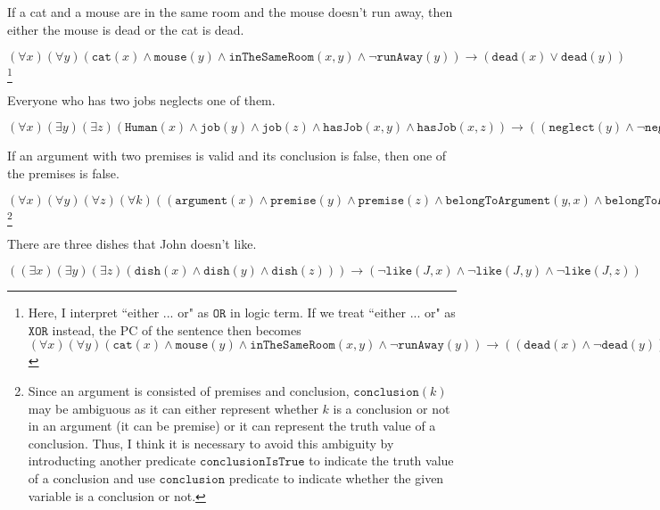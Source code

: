 \begin{QandA}
   \item If a cat and a mouse are in the same room and the mouse doesn’t run away, then either the mouse is dead or the cat is dead.
         \begin{answered}
         $(\forall x)(\forall y)(\texttt{cat}(x) \land \texttt{mouse}(y) \land \texttt{inTheSameRoom}(x,y) \land \neg \texttt{runAway}(y)) 
         \rightarrow (\texttt{dead}(x) \lor \texttt{dead}(y))$ \footnote{Here, I interpret ``either ... or" as $\texttt{OR}$ in logic term. If
         we treat ``either ... or" as $\texttt{XOR}$ instead, the PC of the sentence then becomes
         $(\forall x)(\forall y)(\texttt{cat}(x) \land \texttt{mouse}(y) \land \texttt{inTheSameRoom}(x,y) \land \neg \texttt{runAway}(y)) 
         \rightarrow ((\texttt{dead}(x) \land \neg \texttt{dead}(y)) \lor (\texttt{dead}(y) \land \neg \texttt{dead}(x)))$} 
         \end{answered}
   \item Everyone who has two jobs neglects one of them.
         \begin{answered}
         $(\forall x)(\exists y)(\exists z)(\texttt{Human}(x) \land \texttt{job}(y) \land \texttt{job}(z) \land \texttt{hasJob}(x,y) \land
         \texttt{hasJob}(x,z)) \rightarrow ((\texttt{neglect}(y) \land \neg \texttt{neglect}(z)) \lor (\texttt{neglect}(z) \land 
         \neg \texttt{neglect}(y)))$
         \end{answered}
   \item If an argument with two premises is valid and its conclusion is false, then one of the premises is false.
         \begin{answered}
         $(\forall x)(\forall y)(\forall z)(\forall k)((\texttt{argument}(x) \land \texttt{premise}(y) \land \texttt{premise}(z)
         \land \texttt{belongToArgument}(y,x) \land \texttt{belongToArgument}(z,x) \land \texttt{valid}(x) \land \texttt{conclusion}(k)
         \land \neg \text{conclusionIsTrue}(k) \land \texttt{belongToArgument}(k,x)) \rightarrow (\neg y \lor \neg z))$ 
         \footnote{Since an argument is consisted of premises and conclusion, $\texttt{conclusion}(k)$ may be ambiguous as it can either
         represent whether $k$ is a conclusion or not in an argument (it can be premise) or it can represent the truth value of a conclusion. Thus,
         I think it is necessary to avoid this ambiguity by introducting another predicate $\texttt{conclusionIsTrue}$ to indicate the
         truth value of a conclusion and use $\texttt{conclusion}$ predicate to indicate whether the given variable is a conclusion or not.}
         \end{answered}
   \item There are three dishes that John doesn’t like.
         \begin{answered}
         $((\exists x)(\exists y)(\exists z)(\texttt{dish}(x) \land \texttt{dish}(y) \land \texttt{dish}(z))) \rightarrow (
         \neg \texttt{like}(J,x) \land \neg \texttt{like}(J,y) \land \neg \texttt{like}(J,z))$
         \end{answered}
\end{QandA}